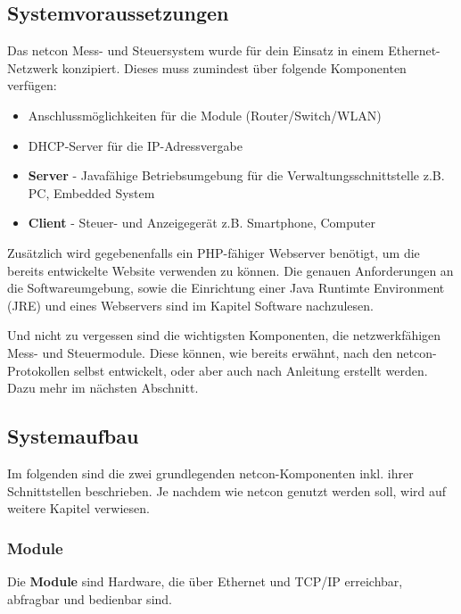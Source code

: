 \documentclass[a4paper,14pt,headsepline]{scrartcl}
\begin{document}
\newpage

\subsection{Systemvoraussetzungen}

Das netcon Mess- und Steuersystem wurde für dein Einsatz in einem Ethernet-Netzwerk konzipiert. Dieses muss zumindest über folgende Komponenten verfügen:
\begin{itemize}
	\item Anschlussmöglichkeiten für die Module (Router/Switch/WLAN)
	\item DHCP-Server für die IP-Adressvergabe
	\item \textbf{Server} - Javafähige Betriebsumgebung für die Verwaltungsschnittstelle z.B. PC, Embedded System
	\item \textbf{Client} - Steuer- und Anzeigegerät z.B. Smartphone, Computer
\end{itemize}

Zusätzlich wird gegebenenfalls ein PHP-fähiger Webserver benötigt, um die bereits entwickelte Website verwenden zu können. Die genauen Anforderungen an die Softwareumgebung, sowie die Einrichtung einer Java Runtimte Environment (JRE) und eines Webservers sind im Kapitel Software nachzulesen.

Und nicht zu vergessen sind die wichtigsten Komponenten, die netzwerkfähigen Mess- und Steuermodule. Diese können, wie bereits erwähnt, nach den netcon-Protokollen selbst entwickelt, oder aber auch nach Anleitung erstellt werden. Dazu mehr im nächsten Abschnitt.
\newpage

\subsection{Systemaufbau}
Im folgenden sind die zwei grundlegenden netcon-Komponenten inkl. ihrer Schnittstellen beschrieben. Je nachdem wie netcon genutzt werden soll, wird auf weitere Kapitel verwiesen.

\subsubsection{Module}
Die \textbf{Module} sind Hardware, die über Ethernet und TCP/IP erreichbar, abfragbar und bedienbar sind. 
\end{document}
